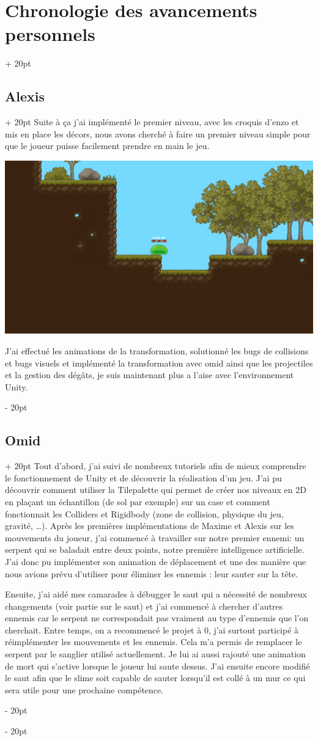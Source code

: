 \documentclass[a4paper, 12pt, twoside]{article}
\newcommand{\ind}[1][20pt]{\advance\leftskip + #1}
\newcommand{\deind}[1][20pt]{\advance\leftskip - #1}
\newenvironment{indt}[2][20pt]{#2 \par \ind[#1]}{\par \deind} %
\begin{document}
\begin{indt}{\section{Chronologie des avancements personnels}}
\begin{indt}{\subsection{Alexis}}
            Suite à ça j'ai implémenté le premier niveau, avec les croquis d'enzo et mis en place les décors, nous avons cherché à faire un premier niveau simple pour que le joueur puisse facilement prendre en main le jeu.

            \begin{center}
                \includegraphics[width=0.8\linewidth]{Lvl1.png}
            \end{center}

            J'ai effectué les animations de la transformation, solutionné les bugs de collisions et  bugs visuels et implémenté la transformation avec omid ainsi que les projectiles et la gestion des dégâts, je suis maintenant plus a l'aise avec l'environnement Unity.
        \end{indt}

        \begin{indt}{\subsection{Omid}}
            Tout d'abord, j'ai suivi de nombreux tutoriels afin de mieux comprendre le fonctionnement de Unity et de découvrir la réalisation d'un jeu. J'ai pu découvrir comment utiliser la Tilepalette qui permet de créer nos niveaux en 2D en plaçant un échantillon (de sol par exemple) sur un case et comment fonctionnait les Colliders et Rigidbody (zone de collision, physique du jeu, gravité, …). Après les premières implémentations de Maxime et Alexis sur les mouvements du joueur, j'ai commencé à travailler sur notre premier ennemi: un serpent qui se baladait entre deux points, notre première intelligence artificielle. J'ai donc pu implémenter son animation de déplacement et une des manière que nous avions prévu d'utiliser pour éliminer les ennemis : leur sauter sur la tête. 

            Ensuite, j'ai aidé mes camarades à débugger le saut qui a nécessité de nombreux changements (voir partie sur le saut) et j'ai commencé à chercher d'autres ennemis car le serpent ne correspondait pas vraiment au type d'ennemis que l'on cherchait. Entre temps, on a recommencé le projet à 0, j'ai surtout participé à réimplémenter les mouvements et les ennemis. Cela m'a permis de remplacer le serpent par le sanglier utilisé actuellement. Je lui ai aussi rajouté une animation de mort qui s'active lorsque le joueur lui saute dessus. J'ai ensuite encore modifié le saut afin que le slime soit capable de sauter lorsqu'il est collé à un mur ce qui sera utile pour une prochaine compétence.


\end{indt}
\end{indt}
\end{document}
